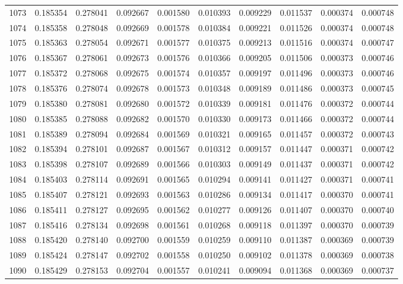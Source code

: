 \begin{tabular}{lrrrrrrrrr}
1073 & 0.185354 & 0.278041 & 0.092667 & 0.001580 & 0.010393 & 0.009229 & 0.011537 & 0.000374 & 0.000748 \\
1074 & 0.185358 & 0.278048 & 0.092669 & 0.001578 & 0.010384 & 0.009221 & 0.011526 & 0.000374 & 0.000748 \\
1075 & 0.185363 & 0.278054 & 0.092671 & 0.001577 & 0.010375 & 0.009213 & 0.011516 & 0.000374 & 0.000747 \\
1076 & 0.185367 & 0.278061 & 0.092673 & 0.001576 & 0.010366 & 0.009205 & 0.011506 & 0.000373 & 0.000746 \\
1077 & 0.185372 & 0.278068 & 0.092675 & 0.001574 & 0.010357 & 0.009197 & 0.011496 & 0.000373 & 0.000746 \\
1078 & 0.185376 & 0.278074 & 0.092678 & 0.001573 & 0.010348 & 0.009189 & 0.011486 & 0.000373 & 0.000745 \\
1079 & 0.185380 & 0.278081 & 0.092680 & 0.001572 & 0.010339 & 0.009181 & 0.011476 & 0.000372 & 0.000744 \\
1080 & 0.185385 & 0.278088 & 0.092682 & 0.001570 & 0.010330 & 0.009173 & 0.011466 & 0.000372 & 0.000744 \\
1081 & 0.185389 & 0.278094 & 0.092684 & 0.001569 & 0.010321 & 0.009165 & 0.011457 & 0.000372 & 0.000743 \\
1082 & 0.185394 & 0.278101 & 0.092687 & 0.001567 & 0.010312 & 0.009157 & 0.011447 & 0.000371 & 0.000742 \\
1083 & 0.185398 & 0.278107 & 0.092689 & 0.001566 & 0.010303 & 0.009149 & 0.011437 & 0.000371 & 0.000742 \\
1084 & 0.185403 & 0.278114 & 0.092691 & 0.001565 & 0.010294 & 0.009141 & 0.011427 & 0.000371 & 0.000741 \\
1085 & 0.185407 & 0.278121 & 0.092693 & 0.001563 & 0.010286 & 0.009134 & 0.011417 & 0.000370 & 0.000741 \\
1086 & 0.185411 & 0.278127 & 0.092695 & 0.001562 & 0.010277 & 0.009126 & 0.011407 & 0.000370 & 0.000740 \\
1087 & 0.185416 & 0.278134 & 0.092698 & 0.001561 & 0.010268 & 0.009118 & 0.011397 & 0.000370 & 0.000739 \\
1088 & 0.185420 & 0.278140 & 0.092700 & 0.001559 & 0.010259 & 0.009110 & 0.011387 & 0.000369 & 0.000739 \\
1089 & 0.185424 & 0.278147 & 0.092702 & 0.001558 & 0.010250 & 0.009102 & 0.011378 & 0.000369 & 0.000738 \\
1090 & 0.185429 & 0.278153 & 0.092704 & 0.001557 & 0.010241 & 0.009094 & 0.011368 & 0.000369 & 0.000737 \\

\end{tabular}
